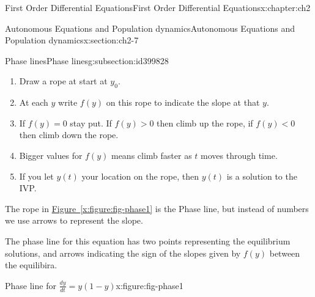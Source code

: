 \documentclass[oneside,10pt,]{book}
\newcommand{\xreffont}{\relax}
\numberwithin{equation}{section}
\numberwithin{equation}{section}
\newcommand{\lt}{<}
\begin{document}
\begin{chapterptx}{First Order Differential Equations}{}{First Order Differential Equations}{}{}{x:chapter:ch2}
\begin{sectionptx}{Autonomous Equations and Population dynamics}{}{Autonomous Equations and Population dynamics}{}{}{x:section:ch2-7}
\begin{subsectionptx}{Phase lines}{}{Phase lines}{}{}{g:subsection:id399828}
\begin{enumerate}
\item{}Draw a rope at start at \(y_{0}\).%
\item{}At each \(y\) write \(f(y)\) on this rope to indicate the slope at that \(y\).%
\item{}If \(f(y)=0\) stay put. If \(f(y)>0\) then climb up the rope, if \(f(y)\lt 0\) then climb down the rope.%
\item{}Bigger values for \(f(y)\) means climb faster as \(t\) moves through time.%
\item{}If you let \(y(t)\) your location on the rope, then \(y(t)\) is a solution to the IVP.%
\end{enumerate}
%
\par
The rope in \hyperref[x:figure:fig-phase1]{Figure~{\xreffont\ref{x:figure:fig-phase1}}} is the Phase line, but instead of numbers we use arrows to represent the slope.%
\par
The phase line for this equation has two points representing the equilibrium solutions, and arrows indicating the sign of the slopes given by \(f(y)\) between the equilibira.%
\begin{figureptx}{Phase line for \(\frac{dy}{dt} = y(1-y)\)}{x:figure:fig-phase1}{}%
\begin{image}{0.35}{0.3}{0.35}%

\end{image}
\end{figureptx}
\end{subsectionptx}
\end{sectionptx}
\end{chapterptx}
\end{document}
